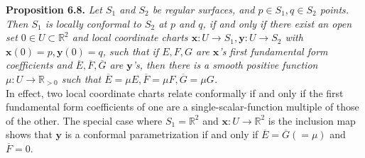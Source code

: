 \documentclass[leqno]{book}
\begin{document}
\noindent\textbf{Proposition 6.8.} \emph{Let $S_1$ and $S_2$ be regular surfaces, and $p\in S_1,q\in S_2$ points.  Then $S_1$ is locally conformal to $S_2$ at $p$ and $q$, if and only if there exist an open set $0\in U\subset\mathbb R^2$ and local coordinate charts $\mathbf x:U\to S_1,\mathbf y:U\to S_2$ with $\mathbf x(0)=p,\mathbf y(0)=q$, such that if $E,F,G$ are $\mathbf x$'s first fundamental form coefficients and $\overline E,\overline F,\overline G$ are $\mathbf y$'s, then there is a smooth positive function $\mu:U\to\mathbb R_{>0}$ such that $\overline E=\mu E,\overline F=\mu F,\overline G=\mu G$.}\\

\noindent In effect, two local coordinate charts relate conformally if and only if the first fundamental form coefficients of one are a single-scalar-function multiple of those of the other.  The special case where $S_1=\mathbb R^2$ and $\mathbf x:U\to\mathbb R^2$ is the inclusion map shows that $\mathbf y$ is a conformal parametrization if and only if $\overline E=\overline G(=\mu)$ and $\overline F=0$.
\end{document}
